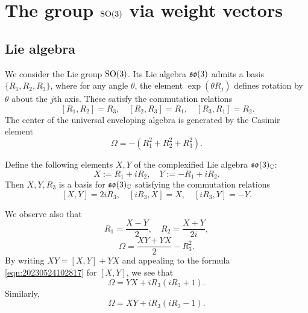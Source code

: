 \documentclass[reqno]{amsart} 
\numberwithin{equation}{section}
\begin{document}
\section{The group $\operatorname{SO}(3)$ via weight vectors}\label{sec:d1a9162ed4bc}

\subsection{Lie algebra}\label{sec:d1a9162ece67}
We consider the Lie group $\operatorname{SO}(3)$.  Its Lie algebra $\operatorname{\mathfrak{s}\mathfrak{o}}(3)$ admits a basis $\{R_1, R_2, R_3\}$, where for any angle $\theta$, the element $\exp(\theta R_j)$ defines rotation by $\theta$ about the $j$th axis.  These satisfy the commutation relations
\begin{equation*}
  ~ [R_1,R_2] = R_3, \quad [R_2,R_3] = R_1, \quad [R_3,R_1] = R_2.
\end{equation*}
The center of the universal enveloping algebra is generated by the Casimir element
\begin{equation*}
  \Omega = -(R_1^2 + R_2^2 + R_3^2).
\end{equation*}

Define the following elements $X,Y$ of the complexified Lie algebra $\operatorname{\mathfrak{s}\mathfrak{o}}(3)_{\mathbb{C}}$:
\begin{equation*}
  X := R_1 + i R_2,
  \quad
  Y := -R_1 + i R_2.
\end{equation*}
Then $X,Y,R_3$ is a basis for $\operatorname{\mathfrak{s}\mathfrak{o}}(3)_{\mathbb{C}}$ satisfying the commutation relations
\begin{equation}\label{eqn:20230524102817} [X,Y] = 2 i R_3,
  \quad
  [i R_3, X] = X,
  \quad
  [i R_3, Y] = - Y.
\end{equation}

We observe also that
\begin{equation*}
  R_1 = \frac{X - Y}{2},
  \quad
  R_2 = \frac{X + Y}{2 i},
\end{equation*}
\begin{equation*}
  \Omega =
  \frac{X Y + Y X}{2} - R_3^2.
\end{equation*}
By writing $X Y = [X,Y] + Y X$ and appealing to the formula \eqref{eqn:20230524102817} for $[X,Y]$, we see that
\begin{equation}\label{eqn:20230524102839}
  \Omega = Y X +  i R_3(i R_3 + 1).
\end{equation}
Similarly,
\begin{equation}\label{eqn:20230524104145}
  \Omega = X Y  + i R_3 (i R_3 - 1).
\end{equation}
\end{document}
